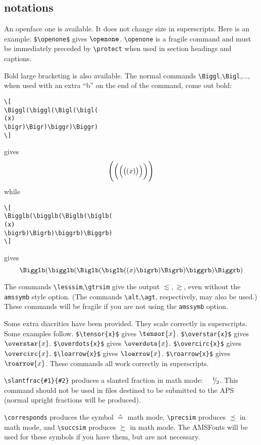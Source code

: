 \subsection{\REVTeX{} notations}
\label{sec:revtexnotations}


An openface one is available. It does not change size in superscripts.
Here is an example: \verb+$\openone$+ gives $\openone$.
\verb+\openone+ is a fragile command and must be immediately preceded by
\verb+\protect+ when used in section headings and captions.

Bold large bracketing is also available. The normal commands
\verb+\Biggl+,\verb+\Bigl+,$\ldots$, when used with an extra ``b'' on the
end of the command, come out bold:
\begin{verbatim}
\[
\Biggl(\biggl(\Bigl(\bigl(
(x)
\bigr)\Bigr)\biggr)\Biggr)
\]
\end{verbatim}
gives
\[
\Biggl(\biggl(\Bigl(\bigl(
(x)
\bigr)\Bigr)\biggr)\Biggr)
\]
while
\begin{verbatim}
\[
\Bigglb(\bigglb(\Biglb(\biglb(
(x)
\bigrb)\Bigrb)\biggrb)\Biggrb)
\]
\end{verbatim}
gives
\[
\Bigglb(\bigglb(\Biglb(\biglb(
(x)
\bigrb)\Bigrb)\biggrb)\Biggrb)
\]

{\makeatletter\if@amssymbols{}\fi}


The commands \verb+\lesssim+,\verb+\gtrsim+ give the output
$\lesssim,\gtrsim$, even without the \verb+amssymb+ style option.
(The commands \verb+\alt+,\verb+\agt+, respectively, may also be used.)
These commands will be fragile if you are not using the \verb+amssymb+ option.


Some extra diacritics have been provided. They scale correctly in
superscripts. Some examples follow.
\verb+$\tensor{x}$+ gives $\tensor{x}$.
\verb+$\overstar{x}$+ gives $\overstar{x}$.
\verb+$\overdots{x}$+ gives $\overdots{x}$.
\verb+$\overcirc{x}$+ gives $\overcirc{x}$.
\verb+$\loarrow{x}$+ gives $\loarrow{x}$.
\verb+$\roarrow{x}$+ gives $\roarrow{x}$.
These commands all work correctly in superscripts.

\verb+\slantfrac{#1}{#2}+ produces a slanted fraction in math mode:
        $\kern1em^{1}\kern-.3em/\kern-.1em_{2}$.
 This command should not be used in files destined to be submitted to
 the APS (normal upright fractions will be produced).

 \verb+\corresponds+ produces the symbol $\corresponds$ math mode,
 \verb+\precsim+ produces $\precsim$ in math mode, and
 \verb+\succsim+ produces $\succsim$ in math mode. The AMSFonts will be used
 for these symbols if you have them, but are not necessary.


